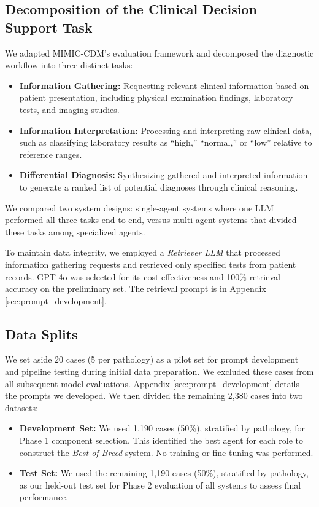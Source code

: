 \documentclass[manuscript, nonacm]{acmart}
\begin{document}
\subsection{Decomposition of the Clinical Decision Support Task}
We adapted MIMIC-CDM's evaluation framework and decomposed the diagnostic workflow into three distinct tasks:
\begin{itemize}
    \item \textbf{Information Gathering:} Requesting relevant clinical information based on patient presentation, including physical examination findings, laboratory tests, and imaging studies.
    
    \item \textbf{Information Interpretation:} Processing and interpreting raw clinical data, such as classifying laboratory results as ``high,'' ``normal,'' or ``low'' relative to reference ranges. 
    
    \item \textbf{Differential Diagnosis:} Synthesizing gathered and interpreted information to generate a ranked list of potential diagnoses through clinical reasoning.
\end{itemize}

We compared two system designs: single-agent systems where one LLM performed all three tasks end-to-end, versus multi-agent systems that divided these tasks among specialized agents.

To maintain data integrity, we employed a \textit{Retriever LLM} that processed information gathering requests and retrieved only specified tests from patient records. GPT-4o was selected for its cost-effectiveness and 100\% retrieval accuracy on the preliminary set. The retrieval prompt is in Appendix \ref{sec:prompt_development}.


\subsection{Data Splits}

 We set aside 20 cases (5 per pathology) as a pilot set for prompt development and pipeline testing during initial data preparation. We excluded these cases from all subsequent model evaluations. Appendix \ref{sec:prompt_development} details the prompts we developed. We then divided the remaining 2,380 cases into two datasets:

\begin{itemize}[topsep=0pt, partopsep=0pt]
   \item \textbf{Development Set:} We used 1,190 cases (50\%), stratified by pathology, for Phase 1 component selection. This identified the best agent for each role to construct the \textit{Best of Breed} system. No training or fine-tuning was performed.
   
   \item \textbf{Test Set:} We used the remaining 1,190 cases (50\%), stratified by pathology, as our held-out test set for Phase 2 evaluation of all systems to assess final performance.
\end{itemize}
\end{document}
